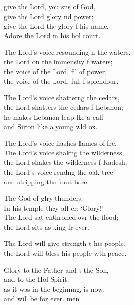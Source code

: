 \settowidth{\versewidth}{The Lord’s voice resounding on the waters, *}
\begin{psalmverse}%
  \begin{patverse}
     give the Lord, you sns of God,\Med\\
    give the Lord glory nd power;\\
give the Lord the glory f his name.\Med\\
    Adore the Lord in his hol court.

The Lord’s voice resounding n the waters,\Med\\
    the Lord on the immensity f waters;\\
the voice of the Lord, fll of power,\Med\\
    the voice of the Lord, full f splendour.

The Lord’s voice shatterng the cedars,\Med\\
    the Lord shatters the cedars f Lebanon;\\
he makes Lebanon leap lke a calf\Med\\
    and Sirion like a young w\pointup{\i}ld ox.

The Lord’s voice flashes flames of f\pointup{\i}re.\Flex\\
    The Lord’s voice shakng the wilderness,\Med\\
    the Lord shakes the wilderness f Kadesh;\\
the Lord’s voice rendng the oak tree\Med\\
    and stripping the forst bare.

The God of glry thunders.\Med\\
    In his temple they all cr: ‘Glory!’\\
The Lord sat enthroned ovr the flood;\Med\\
    the Lord sits as king fr ever.

The Lord will give strength t his people,\Med\\
    the Lord will bless his people w\pointup{\i}th peace.

Glory to the Father and t the Son,\Med\\
    and to the Hol Spirit:\\
as it was in the beginnng, is now,\Med\\
    and will be for ever. men.
  \end{patverse}
\end{psalmverse}
